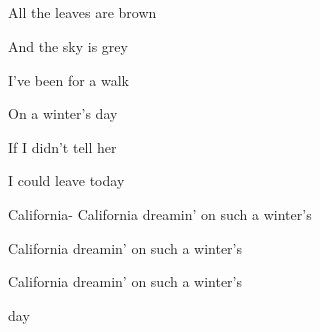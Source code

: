 \begin{song}
\bigskip

  \textbar\   \par
{}    \textbar\   \par
{}    \textbar\   \par
{}    \textbar\   \par

\bigskip

All the leaves are brown   \par
And the sky is grey  \par
I've been for a walk   \par
On a winter's day  \par
If I didn’t tell her   \par
I could leave today  \par

\bigskip

California- California dreamin’ on such a winter's \par
{} California dreamin’ on such a winter's \par
{} California dreamin’ on such a winter's \par
{} day \par
{} \par

\end{song}
